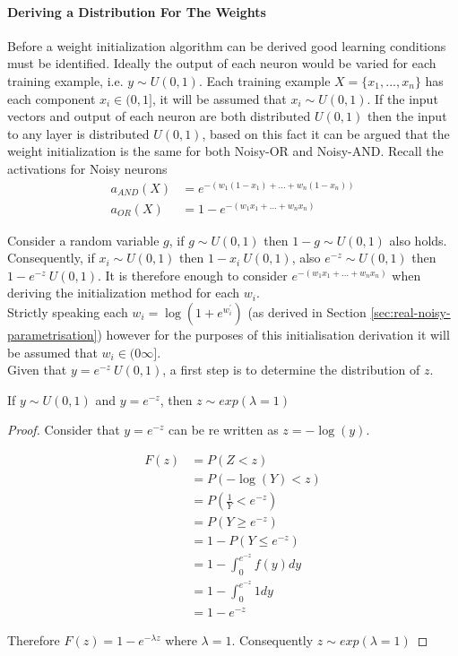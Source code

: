 \paragraph{Deriving a Distribution For The Weights}
Before a weight initialization algorithm can be derived good learning conditions must be identified. Ideally the output of each neuron would be varied for each training example, i.e. $y \sim U(0,1)$. Each training example $X = \{x_1, ..., x_n\}$ has each component $x_i \in (0,1]$, it will be assumed that $x_i \sim U(0,1)$. If the input vectors and output of each neuron are both distributed $U(0,1)$ then the input to any layer is distributed $U(0,1)$, based on this fact it can be argued that the weight initialization is the same for both Noisy-OR and Noisy-AND. Recall the activations for Noisy neurons\\

\begin{align*}
	a_{AND}(X) &= e^{-(w_1(1 - x_1) + ... + w_n(1 - x_n))}\\
	a_{OR}(X) &= 1 - e^{-(w_1x_1 + ... + w_nx_n)}
\end{align*}

Consider a random variable $g$, if $g \sim U(0,1)$ then $1 - g \sim U(0,1)$ also holds. Consequently, if $x_i \sim U(0,1)$ then $1 - x_i ~ U(0,1)$, also $e^{-z} \sim U(0,1)$ then $1 - e^{-z} ~ U(0,1)$. It is therefore enough to consider $e^{-(w_1x_1 + ... + w_nx_n)}$ when deriving the initialization method for each $w_i$.\\

Strictly speaking each $w_i = \log(1 + e^{w^{'}_i})$ (as derived in Section \ref{sec:real-noisy-parametrisation}) however for the purposes of this initialisation derivation it will be assumed that $w_i \in (0 \infty]$.\\

Given that $y = e^{-z} ~ U(0,1)$, a first step is to determine the distribution of $z$.

\begin{theorem}
	If $y \sim U(0,1)$ and $y = e^{-z}$, then $z \sim exp(\lambda = 1)$
\end{theorem}
\begin{proof}
	Consider that $y = e^{-z}$ can be re written as $z = -\log(y)$.
	
	\begin{align*}
		F(z) &= P(Z < z)\\
		&= P(-\log(Y) < z)\\
		&= P(\frac{1}{Y} < e^{-z})\\
		&= P(Y \geq e^{-z})\\
		&= 1 - P(Y \leq e^{-z})\\
		&= 1 - \int_{0}^{e^{-z}} f(y) dy\\
		&= 1 - \int_{0}^{e^{-z}} 1 dy\\
		&= 1 - e^{-z}
	\end{align*}
	
	Therefore $F(z) = 1 - e^{-\lambda z}$ where $\lambda = 1$. Consequently $z \sim exp(\lambda = 1)$
\end{proof}

